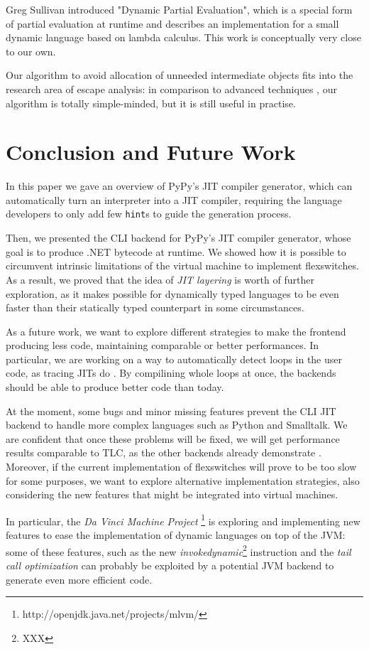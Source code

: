 Greg Sullivan introduced "Dynamic Partial Evaluation", which is a special
form of partial evaluation at runtime \cite{sullivan_dynamic_2001} and describes
an implementation for a small dynamic language based on lambda calculus. This
work is conceptually very close to our own.

Our algorithm to avoid allocation of unneeded intermediate objects fits into
the research area of escape analysis: in comparison to advanced techniques
\cite{Blanchet99escapeanalysis}, \cite{Choi99escapeanalysis} our algorithm is
totally simple-minded, but it is still useful in practise.

\section{Conclusion and Future Work}

In this paper we gave an overview of PyPy's JIT compiler generator,
which can automatically turn an interpreter into a JIT
compiler, requiring the language developers to only add few \texttt{hint}s to
guide the generation process.

Then, we presented the CLI backend for PyPy's JIT compiler generator, whose
goal is to produce .NET bytecode at runtime.  We showed how it is possible to
circumvent intrinsic limitations of the virtual machine to implement
flexswitches.  As a result, we proved that the idea of \emph{JIT layering} is
worth of further exploration, as it makes possible for dynamically typed
languages to be even faster than their statically typed counterpart in some
circumstances.

As a future work, we want to explore different strategies to make the frontend
producing less code, maintaining comparable or better performances.  In
particular, we are working on a way to automatically detect loops in the user
code, as tracing JITs do \cite{gal_hotpathvm_2006}.  By compilining whole
loops at once, the backends should be able to produce better code than today.


At the moment, some bugs and minor missing features prevent the CLI JIT
backend to handle more complex languages such as Python and Smalltalk.  We are
confident that once these problems will be fixed, we will get performance
results comparable to TLC, as the other backends already demonstrate
\cite{PyPyJIT}.  Moreover, if the current implementation of flexswitches will
prove to be too slow for some purposes, we want to explore alternative
implementation strategies, also considering the new features that might be
integrated into virtual machines.

In particular, the \emph{Da Vinci Machine
  Project} \footnote{http://openjdk.java.net/projects/mlvm/} is exploring and
implementing new features to ease the implementation of dynamic languages on
top of the JVM: some of these features, such as the new
\emph{invokedynamic}\footnote{XXX} instruction and the \emph{tail call
  optimization} can probably be exploited by a potential JVM backend to
generate even more efficient code.
